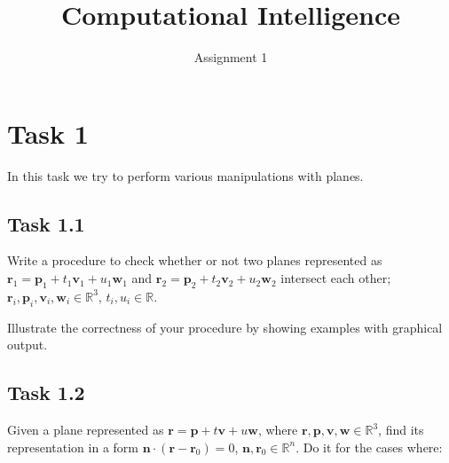 \documentclass[12pt]{article}%
\newcommand{\R}{\mathbb{R}}
\begin{document}
\title{Computational Intelligence}
\author{Assignment 1}
\maketitle




\section{Task 1}

In this task we try to perform various manipulations with planes.

\subsection{Task 1.1}

Write a procedure to check whether or not two planes represented as $\mathbf{r}_1 = \mathbf{p}_1 + t_1\mathbf{v}_1 + u_1\mathbf{w}_1$ and  $\mathbf{r}_2 = \mathbf{p}_2 + t_2\mathbf{v}_2 + u_2\mathbf{w}_2$ intersect each other; $\mathbf{r}_i, \mathbf{p}_i, \mathbf{v}_i, \mathbf{w}_i \in \R^3$, $t_i, u_i \in \R$. 

Illustrate the correctness of your procedure by showing examples with graphical output.


\subsection{Task 1.2}

Given a plane represented as $\mathbf{r} = \mathbf{p} + t\mathbf{v} + u\mathbf{w}$, where $\mathbf{r}, \mathbf{p}, \mathbf{v}, \mathbf{w} \in \R^3$, find its representation in a form $\mathbf{n} \cdot (\mathbf{r}-\mathbf{r}_0) = 0$, $\mathbf{n}, \mathbf{r}_0 \in \R^n$. Do it for the cases where:
\end{document}
